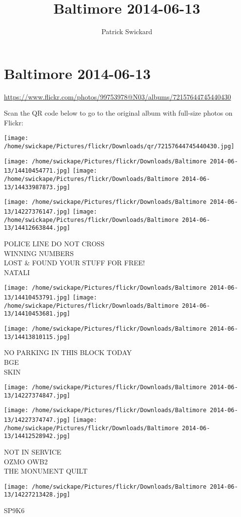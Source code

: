 \documentclass[10pt,letterpaper]{article}
\title{Baltimore 2014-06-13}
\author{Patrick Swickard}
\date{}
\begin{document}
\section*{Baltimore 2014-06-13}

\url{https://www.flickr.com/photos/99753978@N03/albums/72157644745440430}

Scan the QR code below to go to the original album with full-size photos on Flickr:

\texttt{[image: /home/swickape/Pictures/flickr/Downloads/qr/72157644745440430.jpg]}
\pagebreak

\texttt{[image: /home/swickape/Pictures/flickr/Downloads/Baltimore 2014-06-13/14410454771.jpg]}
\texttt{[image: /home/swickape/Pictures/flickr/Downloads/Baltimore 2014-06-13/14433987873.jpg]}

\texttt{[image: /home/swickape/Pictures/flickr/Downloads/Baltimore 2014-06-13/14227376147.jpg]}
\texttt{[image: /home/swickape/Pictures/flickr/Downloads/Baltimore 2014-06-13/14412663844.jpg]}

POLICE LINE DO NOT CROSS\\
WINNING NUMBERS\\
LOST \& FOUND YOUR STUFF FOR FREE!\\
NATALI
\pagebreak

\texttt{[image: /home/swickape/Pictures/flickr/Downloads/Baltimore 2014-06-13/14410453791.jpg]}
\texttt{[image: /home/swickape/Pictures/flickr/Downloads/Baltimore 2014-06-13/14410453681.jpg]}

\texttt{[image: /home/swickape/Pictures/flickr/Downloads/Baltimore 2014-06-13/14413810115.jpg]}

NO PARKING IN THIS BLOCK TODAY\\
BGE\\
SKIN
\pagebreak

\texttt{[image: /home/swickape/Pictures/flickr/Downloads/Baltimore 2014-06-13/14227374847.jpg]}

\vspace{0.25in}
\texttt{[image: /home/swickape/Pictures/flickr/Downloads/Baltimore 2014-06-13/14227374747.jpg]}
\texttt{[image: /home/swickape/Pictures/flickr/Downloads/Baltimore 2014-06-13/14412528942.jpg]}

NOT IN SERVICE\\
OZMO OWB2\\
THE MONUMENT QUILT
\pagebreak

\texttt{[image: /home/swickape/Pictures/flickr/Downloads/Baltimore 2014-06-13/14227213428.jpg]}

SP9K6
\pagebreak
\end{document}
